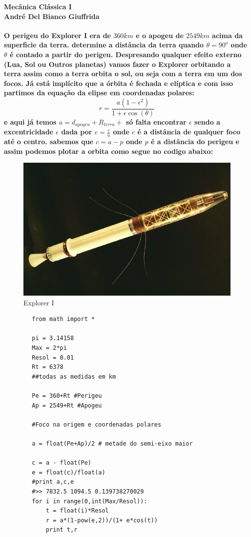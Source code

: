 \documentclass[a4paper,12pt]{exam}
\begin{document}
\begingroup 
	  \bf \Large Mecânica Clássica I\\
	  \indent \normalsize André Del Bianco Giuffrida
	\endgroup
	\\ \quad
	\\
	O perigeu do Explorer I era de $360 km$ e o apogeu de $2549 km$ acima da superficie da terra. determine a distância da terra quando $\theta = 90^o$ onde $\theta$ é contado a partir do perigeu.
	Despresando qualquer efeito externo (Lua, Sol ou Outros planetas) vamos fazer o Explorer orbitando a terra assim como a terra orbita o sol, ou seja com a terra em um dos focos.
	Já está implícito que a órbita é fechada e elíptica e com isso partimos da equação da elipse em coordenadas polares:
	\[ r = \frac{ a(1-\epsilon^2) }{ 1+ \epsilon\cos{(\theta)} }\]
	e aqui já temos $a = d_{apogeu}+R_{terra} + $ só falta encontrar $\epsilon$
	sendo a excentricidade $\epsilon$ dada por $e = \frac{c}{a}$ onde $c$ é a distância de qualquer foco até o centro. sabemos que $c = a - p$ onde $p$ é a distância do perigeu e assim podemos plotar a orbita como segue no codigo abaixo:
		\begin{figure}[h]
			\centering
			\includegraphics[scale=0.3]{Explorer1.jpg}
			\caption{Explorer I}
		\end{figure}
		\begin{lstlisting}	
		from math import *

		pi = 3.14158
		Max = 2*pi
		Resol = 0.01
		Rt = 6378
		##todas as medidas em km

		Pe = 360+Rt #Perigeu
		Ap = 2549+Rt #Apogeu

		#Foco na origem e coordenadas polares

		a = float(Pe+Ap)/2 # metade do semi-eixo maior

		c = a - float(Pe)
		e = float(c)/float(a)
		#print a,c,e
		#>> 7832.5 1094.5 0.139738270029
		for i in range(0,int(Max/Resol)):
			t = float(i)*Resol
			r = a*(1-pow(e,2))/(1+ e*cos(t))
			print t,r

	\end{lstlisting}
\end{document}
